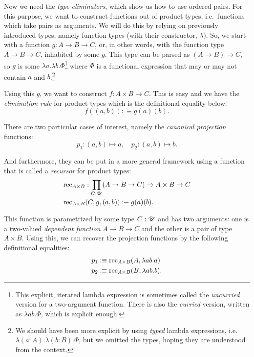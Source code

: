 Now we need the \emph{type eliminators}, which show us how to use ordered pairs.
For this purpose, we want to construct functions out of product types, i.e.\
functions which take pairs as arguments. We will do this by relying on previously
introduced types, namely function types (with their constructor, $ \lambda $).
So, we start with a function $ g : A \to B \to C $, or, in other words, with
the function type $ A \to B \to C $, inhabited by some $ g $. This type can be
parsed as $ (A \to B) \to C $, so $ g $ is some $ \lambda a . \lambda b . \Phi $\footnote{%
  This explicit, iterated lambda expression is sometimes called the
  \emph{uncurried} version for a two-argument function. There is also the
  \emph{curried} version, written as $ \lambda ab.\Phi $, which is explicit
  enough.}
where $ \Phi $ is a functional expression that may or may not contain $ a $ and $ b $.\footnote{%
  We should have been more explicit by using \emph{typed} lambda
  expressions, i.e.\ $ \lambda (a : A) . \lambda (b : B) . \Phi $, but we
  omitted the types, hoping they are understood from the context.}

Using this $ g $, we want to construct $ f : A \times B \to C $. This
is easy and we have the \emph{elimination rule} for product types
which is the definitional equality below:
\[
  f((a, b)) :\equiv g(a)(b).
\]

There are two particular cases of interest, namely the \emph{canonical projection}
functions:
\[
  p_1 : (a, b) \mapsto a, \quad p_2 : (a, b) \mapsto b.
\]

And furthermore, they can be put in a more general framework using a function
that is called a \emph{recursor} for product types:
\begin{align*}
  &\mathrm{rec}_{A \times B} : \prod_{C : \mathscr{U}} (A \to B \to C) \to A \times B \to C \\
  &\mathrm{rec}_{A \times B}(C, g, (a, b)) :\equiv g(a)(b).
\end{align*}

This function is parametrized by some type $ C : \mathscr{U} $ and has two arguments:
one is a two-valued \emph{dependent function} $ A \to B \to C $ and the other
is a pair of type $ A \times B $. Using this, we can recover the projection
functions by the following definitional equalities:
\begin{align*}
  p_1 &:\equiv \mathrm{rec}_{A \times B}(A, \lambda ab . a) \\
  p_2 &:\equiv \mathrm{rec}_{A \times B}(B, \lambda ab . b).
\end{align*}

